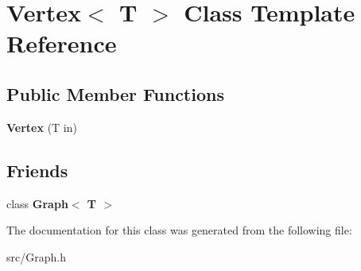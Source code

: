 \hypertarget{class_vertex}{}\section{Vertex$<$ T $>$ Class Template Reference}
\label{class_vertex}
\subsection*{Public Member Functions}
\begin{DoxyCompactItemize}
\item 
\mbox{\label{class_vertex_afcbdd4d4198b672356559cb8fa088408}} 
{\bfseries Vertex} (T in)
\end{DoxyCompactItemize}
\subsection*{Friends}
\begin{DoxyCompactItemize}
\item 
\mbox{\label{class_vertex_aefa9b76cd57411c5354e5620dc2d84dd}} 
class {\bfseries Graph$<$ T $>$}
\end{DoxyCompactItemize}


The documentation for this class was generated from the following file\+:\begin{DoxyCompactItemize}
\item 
src/Graph.\+h\end{DoxyCompactItemize}
